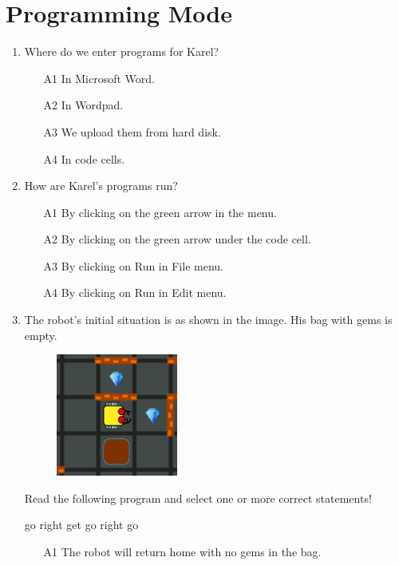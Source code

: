
\section{Programming Mode}

\begin{enumerate}
\item Where do we enter programs for Karel?
\begin{enumerate}
\item[A1] In Microsoft Word.
\item[A2] In Wordpad.
\item[A3] We upload them from hard disk.
\item[A4] In code cells.
\end{enumerate}
\item How are Karel's programs run?
\begin{enumerate}
\item[A1] By clicking on the green arrow in the menu.
\item[A2] By clicking on the green arrow under the code cell.
\item[A3] By clicking on Run in File menu.
\item[A4] By clicking on Run in Edit menu.
\end{enumerate}
\item The robot's initial situation is as shown in the image. His bag with gems is empty.
\begin{figure}[!ht]
\begin{center}
\includegraphics[width=4cm]{img/maze-0.png}
\end{center}
\end{figure}
\noindent
Read the following program and select one or more correct statements!
\begin{bluecode}
go
right
get
go
right 
go
\end{bluecode}
\begin{enumerate}
\item[A1] The robot will return home with no gems in the bag.

\end{enumerate}
\end{enumerate}
